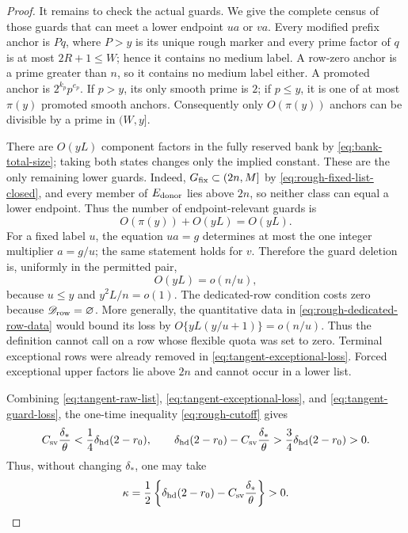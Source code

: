 \documentclass[11pt]{article}
\numberwithin{equation}{section}
\theoremstyle{definition}
\theoremstyle{remark}
\newcommand{\1}{\mathbf 1}
\begin{document}
\begin{proof}
It remains to check the actual guards.  We give the complete census of
those guards that can meet a lower endpoint \(ua\) or \(va\).
Every modified prefix anchor is \(Pq\), where \(P>y\) is its unique
rough marker and every prime factor of \(q\) is at most
\(2R+1\leq W\); hence it contains no medium label.  A row-zero anchor is
a prime greater than \(n\), so it contains no medium label either.  A
promoted anchor is \(2^{k_p}p^{e_p}\).  If \(p>y\), its only smooth prime
is \(2\); if \(p\leq y\), it is one of at most \(\pi(y)\) promoted smooth
anchors.  Consequently only \(O(\pi(y))\) anchors can be divisible by a
prime in \((W,y]\).

There are \(O(yL)\) component factors in the fully reserved bank by
\eqref{eq:bank-total-size}; taking both states changes only the implied
constant.  These are the only remaining lower guards.  Indeed,
\(G_{\rm fix}\subset(2n,M]\) by
\eqref{eq:rough-fixed-list-closed}, and every member of
\(E_{\rm donor}\) lies above \(2n\), so neither class can equal a
lower endpoint.  Thus the number of endpoint-relevant guards is
\[
 O(\pi(y))+O(yL)=O(yL).
\]
For a fixed label \(u\), the equation \(ua=g\) determines at most the one
integer multiplier \(a=g/u\); the same statement holds for \(v\).
Therefore the guard deletion is, uniformly in the permitted pair,
\begin{equation}
                 O(yL)=o(n/u),
\label{eq:tangent-guard-loss}
\end{equation}
because \(u\leq y\) and \(y^2L/n=o(1)\).
The dedicated-row condition costs zero because
\(\mathscr D_{\rm row}=\varnothing\).  More generally, the quantitative
data in \eqref{eq:rough-dedicated-row-data} would bound its loss by
\(O\{yL(y/u+1)\}=o(n/u)\).  Thus the definition cannot call on a row
whose flexible quota was set to zero.  Terminal exceptional rows were
already removed in \eqref{eq:tangent-exceptional-loss}.  Forced exceptional upper factors
lie above \(2n\) and cannot occur in a lower list.

Combining \eqref{eq:tangent-raw-list},
\eqref{eq:tangent-exceptional-loss}, and
\eqref{eq:tangent-guard-loss}, the one-time inequality
\eqref{eq:rough-cutoff} gives
\[
 C_{\rm sv}\frac{\delta_*}{\theta}
 <\frac14\delta_{\rm hd}(2-r_0),
\qquad
 \delta_{\rm hd}(2-r_0)
       -C_{\rm sv}\frac{\delta_*}{\theta}
 >\frac34\delta_{\rm hd}(2-r_0)>0.
\]
Thus, without changing \(\delta_*\), one may take
\[
 \kappa=\frac12\left\{\delta_{\rm hd}(2-r_0)
       -C_{\rm sv}\frac{\delta_*}{\theta}\right\}>0.
\]
\end{proof}
\end{document}

